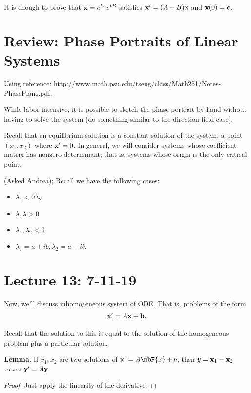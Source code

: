 \documentclass{article}
\begin{document}
It is enough to prove that $\mathbf{x} = e^{tA} e^{tB}$ satisfies $\mathbf{x}' = (A+B) \mathbf{x}$ and $\mathbf{x}(0) = \mathbf{c}$.

\section{Review: Phase Portraits of Linear Systems}

Using reference: http://www.math.psu.edu/tseng/class/Math251/Notes-PhasePlane.pdf.

While labor intensive, it is possible to sketch the phase portrait by hand without having to solve the system (do something similar to the direction field case).

Recall that an equilibrium solution is a constant solution of the system, a point $(x_1, x_2)$ where $\mathbf{x}' = 0$.  In general, we will consider systems whose coefficient matrix has nonzero determinant; that is, systems whose origin is the only critical point.


(Asked Andrea); Recall we have the following cases:

\begin{itemize}
  \item $\lambda_1 < 0 \lambda_2$
  \item $\lambda, \lambda > 0$
  \item $\lambda_1, \lambda_2 < 0$
  \item $\lambda_1 =  a + ib, \lambda_2 = a - ib$.
\end{itemize}


\section{Lecture 13: 7-11-19}

Now, we'll discuss inhomogeneous system of ODE.  That is, problems of the form
\begin{align*}
  \mathbf{x}' = A \mathbf{x} + \mathbf{b}.
\end{align*}

Recall that the solution to this is equal to the solution of the homogeneous problem plus a particular solution.

{\bf Lemma.} If $x_1, x_2$ are two solutions of $\mbf{x}' = A \mbF{x} + b$, then $y = \mathbf{x}_1 - \mathbf{x}_2$ solves $\mathbf{y}' = A \mathbf{y}$.

\begin{proof}
  Just apply the linearity of the derivative.
\end{proof}
\end{document}
